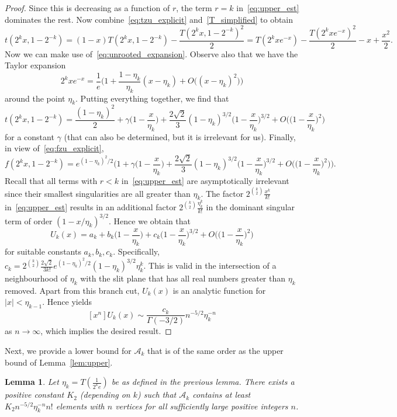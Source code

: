 \documentclass[a4paper]{article}
\newcommand{\A}{\mathcal{A}}
\newtheorem{lemma}{Lemma}
\theoremstyle{remark}
\begin{document}
\begin{proof}
Since this is decreasing as a function of $r$, the term $r=k$ in~\eqref{eq:upper_est} dominates the rest. Now combine~\eqref{eq:tzu_explicit} and~\eqref{T_simplified} to obtain
$$t(2^k x, 1- 2^{-k}) = (1-x) T(2^k x, 1- 2^{-k}) - \frac{T(2^k x, 1- 2^{-k})^2}{2} = T(2^k x e^{-x}) - \frac {T(2^k x e^{-x})^2}{2} - x + \frac{x^2}{2}.$$
Now we can make use of~\eqref{eq:unrooted_expansion}. Observe also that we have the Taylor expansion
$$2^k x e^{-x} = \frac1{e} \Big(1 + \frac{1-\eta_k}{\eta_k} (x - \eta_k) + O \big( (x-\eta_k)^2 \big) \Big)$$
around the point $\eta_k$. Putting everything together, we find that
$$t(2^k x, 1- 2^{-k}) = \frac{(1-\eta_k)^2}{2} + \gamma \Big(1-\frac{x}{\eta_k}\Big) + 
\frac{2\sqrt{2}}{3} (1-\eta_k)^{3/2} \Big(1-\frac{x}{\eta_k}\Big)^{3/2} + O \Big( \Big(1-\frac{x}{\eta_k}\Big)^2 \Big)$$
for a constant $\gamma$ (that can also be determined, but it is irrelevant for us). Finally, in view of~\eqref{eq:fzu_explicit},
$$f(2^k x, 1- 2^{-k}) = e^{(1-\eta_k)^2/2} \bigg( 1 + \gamma\Big(1-\frac{x}{\eta_k}\Big)  + \frac{2\sqrt{2}}{3} (1-\eta_k)^{3/2} \Big(1-\frac{x}{\eta_k}\Big)^{3/2} + O \Big( \Big(1-\frac{x}{\eta_k}\Big)^2 \Big) \bigg).$$
Recall that all terms with $r < k$ in~\eqref{eq:upper_est} are asymptotically irrelevant since their smallest singularities are all greater than $\eta_k$. The factor $2^{\binom{k}{2}} \frac{x^k}{k!}$ in~\eqref{eq:upper_est} results in an additional factor $2^{\binom{k}{2}} \frac{\eta_k^k}{k!}$ in the dominant singular term of order $(1- x/\eta_k)^{3/2}$. Hence we obtain that \begin{equation}\label{eq:asymp-exp}
U_k(x) = a_k + b_k\Big(1-\frac{x}{\eta_k}\Big) + c_k \Big(1-\frac{x}{\eta_k}\Big)^{3/2} + O \Big( \Big(1-\frac{x}{\eta_k}\Big)^2 \Big)
\end{equation}
for suitable constants $a_k,b_k,c_k$. Specifically, $c_k = 2^{\binom{k}{2}}\frac{2\sqrt{2}}{3k!} e^{(1-\eta_k)^2/2}(1-\eta_k)^{3/2}\eta_k^k$. This is valid in the intersection of a neighbourhood of $\eta_k$ with the slit plane that has all real numbers greater than $\eta_k$ removed. Apart from this branch cut, $U_k(x)$ is an analytic function for $|x| < \eta_{k-1}$. Hence \cite[Theorem VI.4]{Flajolet2009analytic} yields
\begin{equation}\label{eq:asymp-formula}
[x^n]U_k(x) \sim \frac{c_k}{\Gamma(-3/2)} n^{-5/2} \eta_k^{-n}
\end{equation}
as $n \to \infty$, which implies the desired result.
\end{proof}

Next, we provide a lower bound for $\A_k$ that is of the same order as the upper bound of Lemma~\ref{lem:upper}.
\begin{lemma} \label{lem:lower}
Let $\eta_k = T(\frac{1}{2^k e})$ be as defined in the previous lemma. There exists a positive constant $K_2$ (depending on $k$) such that $\A_k$ contains at least $K_2 n^{-5/2} \eta_k^{-n}n!$ elements with $n$ vertices for all sufficiently large positive integers $n$.
\end{lemma}
\end{document}
